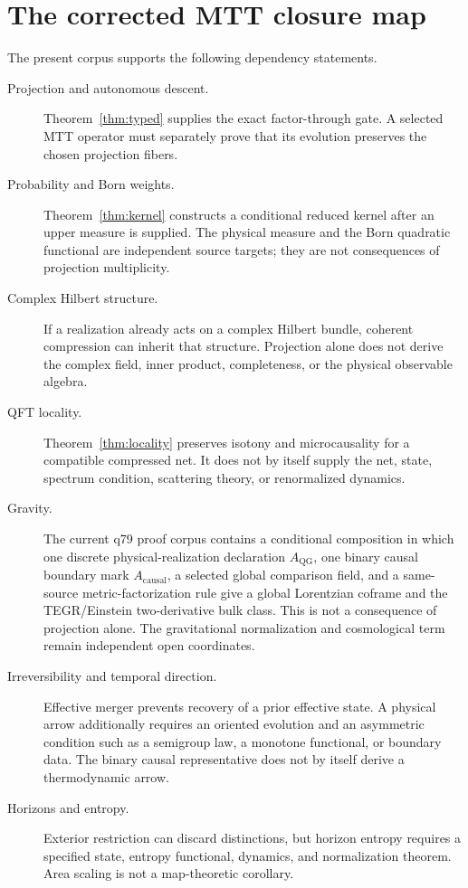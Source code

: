 \documentclass[11pt]{article}
\begin{document}
\section{The corrected MTT closure map}\label{sec:closure-map}

The present corpus supports the following dependency statements.

\begin{description}
\item[Projection and autonomous descent.] Theorem~\ref{thm:typed} supplies the
exact factor-through gate.  A selected MTT operator must separately prove that
its evolution preserves the chosen projection fibers.

\item[Probability and Born weights.] Theorem~\ref{thm:kernel} constructs a
conditional reduced kernel after an upper measure is supplied.  The physical
measure and the Born quadratic functional are independent source targets; they
are not consequences of projection multiplicity.

\item[Complex Hilbert structure.] If a realization already acts on a complex
Hilbert bundle, coherent compression can inherit that structure.  Projection
alone does not derive the complex field, inner product, completeness, or the
physical observable algebra.

\item[QFT locality.] Theorem~\ref{thm:locality} preserves isotony and
microcausality for a compatible compressed net.  It does not by itself supply
the net, state, spectrum condition, scattering theory, or renormalized
dynamics.

\item[Gravity.] The current q79 proof corpus contains a conditional
composition in which one discrete physical-realization declaration
$A_{\mathrm{QG}}$, one binary causal boundary mark $A_{\mathrm{causal}}$, a
selected global comparison field, and a same-source metric-factorization rule
give a global Lorentzian coframe and the TEGR/Einstein two-derivative bulk
class.  This is not a consequence of projection alone.  The gravitational
normalization and cosmological term remain independent open coordinates.

\item[Irreversibility and temporal direction.] Effective merger prevents
recovery of a prior effective state.  A physical arrow additionally requires
an oriented evolution and an asymmetric condition such as a semigroup law, a
monotone functional, or boundary data.  The binary causal representative does
not by itself derive a thermodynamic arrow.

\item[Horizons and entropy.] Exterior restriction can discard distinctions,
but horizon entropy requires a specified state, entropy functional, dynamics,
and normalization theorem.  Area scaling is not a map-theoretic corollary.
\end{description}
\end{document}
